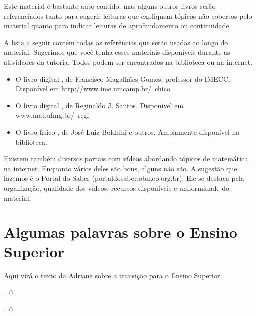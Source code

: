 \documentclass[10pt,openany,twoside=semi]{book}
\newcounter{testpage}
\newcommand{\clearquadruplepage}{	
   	\setcounter{testpage}{\intcalcMod{\thepage}{4}}   	
   	\ifnum\thetestpage=0
	   	\newpage
	\else
		\ifnum\thetestpage=1
			\newpage \thispagestyle{empty} \hbox{} \newpage \thispagestyle{empty} \hbox{} \newpage \thispagestyle{empty} \hbox{} \newpage
		\else
			\ifnum\thetestpage=2
				\newpage \thispagestyle{empty} \hbox{} \newpage \thispagestyle{empty} \hbox{} \newpage
			\else
				\ifnum\thetestpage=3
					\newpage \thispagestyle{empty} \hbox{} \newpage
				\fi
			\fi
		\fi	
	\fi
}
\theoremstyle{estiloQuestao}
\theoremstyle{estiloQuestao}
\theoremstyle{estiloQuestao}
\theoremstyle{plain}
\theoremstyle{estiloSetinha}
\theoremstyle{estiloSetinha}
\theoremstyle{estiloSetinha}
\theoremstyle{estiloSetinha}
\begin{document}
Este material é bastante auto-contido, mas alguns outros livros serão referenciados tanto para sugerir leituras que expliquem tópicos não cobertos pelo material quanto para indicar leituras de aprofundamento ou continuidade.

A lista a seguir contém todas as referências que serão usadas ao longo do material. Sugerimos que você tenha esses materiais disponíveis durante as atividades da tutoria. Todos podem ser encontrados na biblioteca ou na internet.

\begin{itemize}
 \item O livro digital , de Francisco Magalhães Gomes, professor do IMECC. Disponível em http://www.ime.unicamp.br/~chico
 \item O livro digital , de Reginaldo J. Santos. Disponível em www.mat.ufmg.br/~regi
 \item O livro físico , de José Luiz Boldrini e outros. Amplamente disponível na biblioteca.
\end{itemize}

Existem também diversos portais com vídeos abordando tópicos de matemática na internet. Enquanto vários deles são bons, alguns não são. A sugestão que fazemos é o Portal do Saber (portaldosaber.obmep.org.br). Ele se destaca pela organização, qualidade dos vídeos, recursos disponíveis e uniformidade do material.

\section{Algumas palavras sobre o Ensino Superior}

Aqui virá o texto da Adriane sobre a transição para o Ensino Superior.

\ifnum{}=0
	\clearquadruplepage
\fi


\ifnum{}=0
	\clearquadruplepage
\fi







 




 
\end{document}
